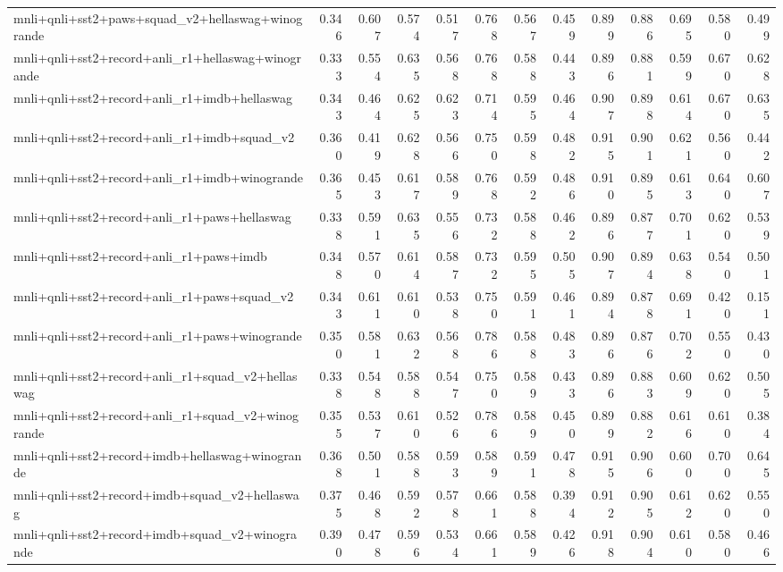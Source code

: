 \begin{table}[t]
\begin{tabular}{lrrrrrrrrrrrr}
    mnli+qnli+sst2+paws+squad\_v2+hellaswag+winogrande & 0.346 & 0.607 & 0.574 & 0.517 & 0.768 & 0.567 & 0.459 & 0.899 & 0.886 & 0.695 & 0.580 & 0.499 \\
    mnli+qnli+sst2+record+anli\_r1+hellaswag+winogrande & 0.333 & 0.554 & 0.635 & 0.568 & 0.768 & 0.588 & 0.443 & 0.896 & 0.881 & 0.599 & 0.670 & 0.628 \\
    mnli+qnli+sst2+record+anli\_r1+imdb+hellaswag & 0.343 & 0.464 & 0.625 & 0.623 & 0.714 & 0.595 & 0.464 & 0.907 & 0.898 & 0.614 & 0.670 & 0.635 \\
    mnli+qnli+sst2+record+anli\_r1+imdb+squad\_v2 & 0.360 & 0.419 & 0.628 & 0.566 & 0.750 & 0.598 & 0.482 & 0.915 & 0.901 & 0.621 & 0.560 & 0.442 \\
    mnli+qnli+sst2+record+anli\_r1+imdb+winogrande & 0.365 & 0.453 & 0.617 & 0.589 & 0.768 & 0.592 & 0.486 & 0.910 & 0.895 & 0.613 & 0.640 & 0.607 \\
    mnli+qnli+sst2+record+anli\_r1+paws+hellaswag & 0.338 & 0.591 & 0.635 & 0.556 & 0.732 & 0.588 & 0.462 & 0.896 & 0.877 & 0.701 & 0.620 & 0.539 \\
    mnli+qnli+sst2+record+anli\_r1+paws+imdb & 0.348 & 0.570 & 0.614 & 0.587 & 0.732 & 0.595 & 0.505 & 0.907 & 0.894 & 0.638 & 0.540 & 0.501 \\
    mnli+qnli+sst2+record+anli\_r1+paws+squad\_v2 & 0.343 & 0.611 & 0.610 & 0.538 & 0.750 & 0.591 & 0.461 & 0.894 & 0.878 & 0.691 & 0.420 & 0.151 \\
    mnli+qnli+sst2+record+anli\_r1+paws+winogrande & 0.350 & 0.581 & 0.632 & 0.568 & 0.786 & 0.588 & 0.483 & 0.896 & 0.876 & 0.702 & 0.550 & 0.430 \\
    mnli+qnli+sst2+record+anli\_r1+squad\_v2+hellaswag & 0.338 & 0.548 & 0.588 & 0.547 & 0.750 & 0.589 & 0.433 & 0.896 & 0.883 & 0.609 & 0.620 & 0.505 \\
    mnli+qnli+sst2+record+anli\_r1+squad\_v2+winogrande & 0.355 & 0.537 & 0.610 & 0.526 & 0.786 & 0.589 & 0.450 & 0.899 & 0.882 & 0.616 & 0.610 & 0.384 \\
    mnli+qnli+sst2+record+imdb+hellaswag+winogrande & 0.368 & 0.501 & 0.588 & 0.593 & 0.589 & 0.591 & 0.478 & 0.915 & 0.906 & 0.600 & 0.700 & 0.645 \\
    mnli+qnli+sst2+record+imdb+squad\_v2+hellaswag & 0.375 & 0.468 & 0.592 & 0.578 & 0.661 & 0.588 & 0.394 & 0.912 & 0.905 & 0.612 & 0.620 & 0.550 \\
    mnli+qnli+sst2+record+imdb+squad\_v2+winogrande & 0.390 & 0.478 & 0.596 & 0.534 & 0.661 & 0.589 & 0.426 & 0.918 & 0.904 & 0.610 & 0.580 & 0.466 \\

\end{tabular}
\end{table}
